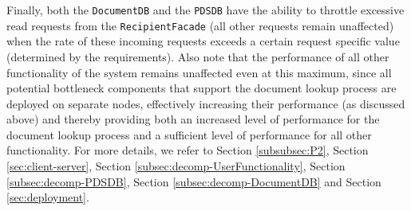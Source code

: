 \documentclass[a4paper,10pt]{article}
\begin{document}
Finally, both the \texttt{DocumentDB} and the \texttt{PDSDB} have the ability to throttle excessive read requests from the \texttt{RecipientFacade} (all other requests remain unaffected) when the rate of these incoming requests exceeds a certain request specific value (determined by the requirements). Also note that the performance of all other functionality of the system remains unaffected even at this maximum, since all potential bottleneck components that support the document lookup process are deployed on separate nodes, effectively increasing their performance (as discussed above) and thereby providing both an increased level of performance for the document lookup process and a sufficient level of performance for all other functionality.
For more details, we refer to Section \ref{subsubsec:P2}, Section \ref{sec:client-server}, Section \ref{subsec:decomp-UserFunctionality}, Section \ref{subsec:decomp-PDSDB}, Section \ref{subsec:decomp-DocumentDB} and Section \ref{sec:deployment}.
\end{document}
